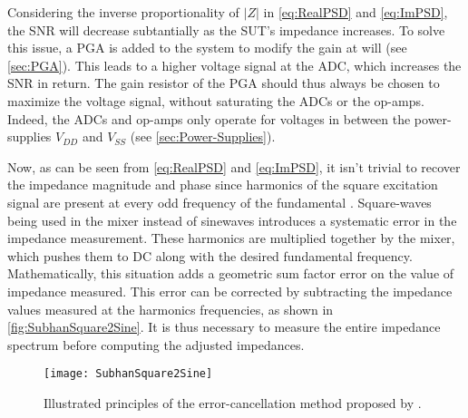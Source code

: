 Considering the inverse proportionality of $\lvert Z \rvert$ in \autoref{eq:RealPSD} and \autoref{eq:ImPSD}, the SNR will decrease subtantially as the SUT's impedance increases. To solve this issue, a PGA is added to the system to modify the gain at will (see \autoref{sec:PGA}). This leads to a higher voltage signal at the ADC, which increases the SNR in return. The gain resistor of the PGA should thus always be chosen to maximize the voltage signal, without saturating the ADCs or the op-amps. Indeed, the ADCs and op-amps only operate for voltages in between the power-supplies $V_{DD}$ and $V_{SS}$ (see \autoref{sec:Power-Supplies}). \par

 Now, as can be seen from \autoref{eq:RealPSD} and \autoref{eq:ImPSD}, it isn't trivial to recover the impedance magnitude and phase since harmonics of the square excitation signal are present at every odd frequency of the fundamental \cite{Subhan2019}. Square-waves being used in the mixer instead of sinewaves introduces a systematic error in the impedance measurement. These harmonics are multiplied together by the mixer, which pushes them to DC along with the desired fundamental frequency. Mathematically, this situation adds a geometric sum factor error on the value of impedance measured. This error can be corrected by subtracting the impedance values measured at the harmonics frequencies, as shown in \autoref{fig:SubhanSquare2Sine}. It is thus necessary to measure the entire impedance spectrum before computing the adjusted impedances. \par
\begin{figure}[h]
    \centering
    \texttt{[image: SubhanSquare2Sine]}
    \caption{Illustrated principles of the error-cancellation method proposed by \citep{Subhan2019}.}
    \label{fig:SubhanSquare2Sine}
\end{figure}

